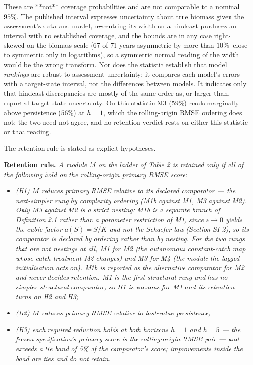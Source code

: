 \documentclass[11pt]{article}
\providecommand{\tightlist}{\setlength{\itemsep}{0pt}\setlength{\parskip}{0pt}}
\begin{document}
These are **not** coverage probabilities and are not comparable to a
nominal \(95\%\). The published interval expresses uncertainty about
true biomass given the assessment's data and model; re-centring its
width on a hindcast produces an interval with no established coverage,
and the bounds are in any case right-skewed on the biomass scale
(\(67\) of \(71\) years asymmetric by more than \(10\%\), close to
symmetric only in logarithms), so a symmetric normal reading of the
width would be the wrong transform. Nor does the statistic establish
that model \emph{rankings} are robust to assessment uncertainty: it
compares each model's errors with a target-state interval, not the
differences between models. It indicates only that hindcast
discrepancies are mostly of the same order as, or larger than, reported
target-state uncertainty. On this statistic M3 (\(59\%\)) reads
marginally above persistence (\(56\%\)) at \(h=1\), which the
rolling-origin RMSE ordering does not; the two need not agree, and no
retention verdict rests on either this statistic or that reading.

The retention rule is stated as explicit hypotheses.

\textbf{Retention rule.} \emph{A module \(M\) on the ladder of Table 2
is retained only if all of the following hold on the rolling-origin
primary RMSE score:}

\begin{itemize}
\tightlist
\item
  \emph{(H1) \(M\) reduces primary RMSE relative to its declared
  comparator --- the next-simpler rung by complexity ordering (M1b against
  M1, M3 against M2). Only M3 against M2 is a strict nesting: M1b is a
  separate branch of Definition 2.1 rather than a parameter restriction
  of M1, since \(\mathfrak s \to 0\) yields the cubic factor
  \(a(S)=S/K\) and not the Schaefer law (Section SI-2), so its
  comparator is declared by ordering rather than by nesting. For the two
  rungs that are not nestings at all, M1
  for M2 (the autonomous constant-catch map whose catch treatment M2
  changes) and M3 for M4 (the module the lagged initialisation acts on). M1b is reported
  as the alternative comparator for M2 and never decides retention. M1
  is the first structural rung and has no simpler structural comparator,
  so H1 is vacuous for M1 and its retention turns on H2 and H3;}
\item
  \emph{(H2) \(M\) reduces primary RMSE relative to last-value
  persistence;}
\item
  \emph{(H3) each required reduction holds at both horizons \(h=1\) and
  \(h=5\) --- the frozen specification's primary score is the
  rolling-origin RMSE pair --- and exceeds a tie band of 5\% of the
  comparator's score; improvements inside the band are ties and do not
  retain.}
\end{itemize}
\end{document}

